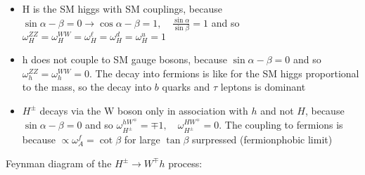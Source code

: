 \documentclass[12pt,oneside]{book}
\begin{document}
\begin{itemize}
    \item H is the SM higgs with SM couplings, because $\sin{\alpha-\beta} = 0 \to \cos{\alpha-\beta} = 1, \quad \frac{\sin{\alpha}}{\sin{\beta}} = 1$ and so $\omega^{ZZ}_{H} = \omega^{WW}_{H} = \omega^{\ell}_H = \omega^{d}_H = \omega^{u}_H = 1$
    \item h does not couple to SM gauge bosons, because $\sin{\alpha-\beta} = 0$ and so $\omega^{ZZ}_{h} = \omega^{WW}_{h} = 0$. The decay into fermions is like for the SM higgs proportional to the mass, so the decay into $b$ quarks and $\tau$ leptons is dominant
    \item $H^{\pm}$ decays via the W boson only in association with $h$ and not $H$, because $\sin{\alpha-\beta} = 0$ and so $\omega^{hW^{\mp}}_{H^{\pm}} = \mp 1, \quad \omega^{HW^{\mp}}_{H^{\pm}} = 0$. The coupling to fermions is because $\propto \omega_A^{f} = \cot{\beta}$ for large $\tan{\beta}$ surpressed (fermionphobic limit)
\end{itemize}

Feynman diagram of the $H^{\pm} \to W^{\mp}h$ process:


\end{document}
